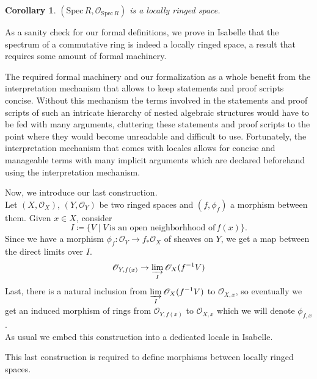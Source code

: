 \documentclass[12pt]{scrartcl}
\newtheorem{cor}[proposition]{Corollary}
\def\spec{\text{Spec}\,R}
\begin{document}
	
\begin{cor}
	$(\text{Spec}\,R, \mathscr{O}_{\spec})$ is a locally ringed space.
\end{cor}

As a sanity check for our formal definitions, we prove in Isabelle that the spectrum of a commutative ring is indeed a locally ringed space, a result that requires some amount of formal machinery.


The required formal machinery and our formalization as a whole benefit from the interpretation mechanism that allows to keep statements and proof scripts concise. Without this mechanism the terms involved in the statements and proof scripts of such an intricate hierarchy of nested algebraic structures would have to be fed with many arguments, cluttering these statements and proof scripts to the point where they would become unreadable and difficult to use. Fortunately, the interpretation mechanism that comes with locales allows for concise and manageable terms with many implicit arguments which are declared beforehand using the interpretation mechanism.
  
Now, we introduce our last construction. \\
	Let $(X, \mathscr{O}_X)$, $(Y, \mathscr{O}_Y)$ be two ringed spaces and $(f, \phi_f)$ a morphism between them. Given $x \in X$, consider 
	\[
	I \coloneqq \lbrace V \mid V \, \text{is an open neighborhhood of}\, f(x) \rbrace .
	\]
	Since we have a morphism $\phi_f: \mathscr{O}_Y \rightarrow f_* \mathscr{O}_X $ of sheaves on $Y$, we get a map between the direct limits over $I$. 
	\[
	\mathscr{O}_{Y, f(x)} \rightarrow \displaystyle \varinjlim_I \mathscr{O}_X (f^{-1} V)
	\]
	Last, there is a natural inclusion from $\displaystyle \varinjlim_I \mathscr{O}_X (f^{-1} V)$ to $\mathscr{O}_{X, x}$, so eventually we get an induced morphism of rings from $\mathscr{O}_{Y, f(x)}$ to $\mathscr{O}_{X, x}$ which we will denote $\phi_{f, x}$. \\	
As usual we embed this construction into a dedicated locale in Isabelle.


This last construction is required to define morphisms between locally ringed spaces.
			
\end{document}

